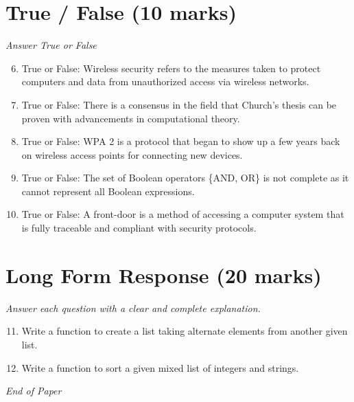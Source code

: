 \documentclass[12pt]{article}
\begin{document}
\section*{True / False (10 marks)}
\textit{Answer True or False}
\begin{enumerate}[label=\arabic*.]
\setcounter{enumi}{5}
\item True or False: Wireless security refers to the measures taken to protect computers and data from unauthorized access via wireless networks.
\item True or False: There is a consensus in the field that Church's thesis can be proven with advancements in computational theory.
\item True or False: WPA 2 is a protocol that began to show up a few years back on wireless access points for connecting new devices.
\item True or False: The set of Boolean operators \{AND, OR\} is not complete as it cannot represent all Boolean expressions.
\item True or False: A front-door is a method of accessing a computer system that is fully traceable and compliant with security protocols.
\end{enumerate}

\section*{Long Form Response (20 marks)}
\textit{Answer each question with a clear and complete explanation.}
\begin{enumerate}[label=\arabic*.]
\setcounter{enumi}{10}
\item Write a function to create a list taking alternate elements from another given list.
\item Write a function to sort a given mixed list of integers and strings.
\end{enumerate}

\vfill
\noindent\textit{End of Paper}
\end{document}
